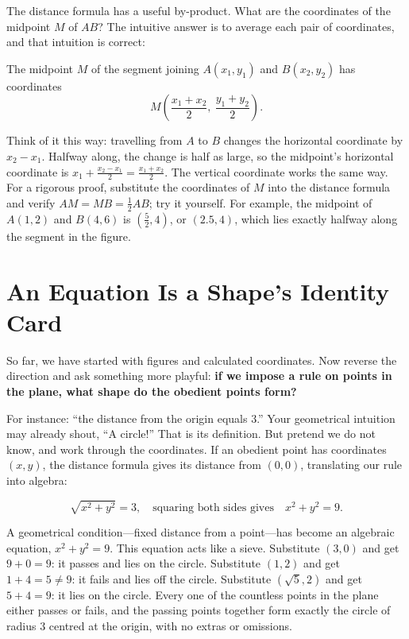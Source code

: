 The distance formula has a useful by-product. What are the coordinates of the midpoint $M$ of $AB$? The intuitive answer is to average each pair of coordinates, and that intuition is correct:

\begin{tuilun}
The midpoint $M$ of the segment joining $A(x_{1},y_{1})$ and $B(x_{2},y_{2})$ has coordinates
\[
M\left(\frac{x_{1}+x_{2}}{2},\ \frac{y_{1}+y_{2}}{2}\right).
\]
\end{tuilun}

Think of it this way: travelling from $A$ to $B$ changes the horizontal coordinate by $x_{2}-x_{1}$. Halfway along, the change is half as large, so the midpoint's horizontal coordinate is $x_{1}+\frac{x_{2}-x_{1}}{2}=\frac{x_{1}+x_{2}}{2}$. The vertical coordinate works the same way. For a rigorous proof, substitute the coordinates of $M$ into the distance formula and verify $AM=MB=\frac{1}{2}AB$; try it yourself. For example, the midpoint of $A(1,2)$ and $B(4,6)$ is $(\frac{5}{2},4)$, or $(2.5,4)$, which lies exactly halfway along the segment in the figure.

\section{An Equation Is a Shape's Identity Card}

So far, we have started with figures and calculated coordinates. Now reverse the direction and ask something more playful: \textbf{if we impose a rule on points in the plane, what shape do the obedient points form?}

For instance: ``the distance from the origin equals $3$.'' Your geometrical intuition may already shout, ``A circle!'' That is its definition. But pretend we do not know, and work through the coordinates. If an obedient point has coordinates $(x,y)$, the distance formula gives its distance from $(0,0)$, translating our rule into algebra:

\[
\sqrt{x^{2}+y^{2}}=3,\quad\text{squaring both sides gives}\quad x^{2}+y^{2}=9.
\]

A geometrical condition---fixed distance from a point---has become an algebraic equation, $x^{2}+y^{2}=9$. This equation acts like a sieve. Substitute $(3,0)$ and get $9+0=9$: it passes and lies on the circle. Substitute $(1,2)$ and get $1+4=5\ne 9$: it fails and lies off the circle. Substitute $(\sqrt{5},2)$ and get $5+4=9$: it lies on the circle. Every one of the countless points in the plane either passes or fails, and the passing points together form exactly the circle of radius $3$ centred at the origin, with no extras or omissions.

